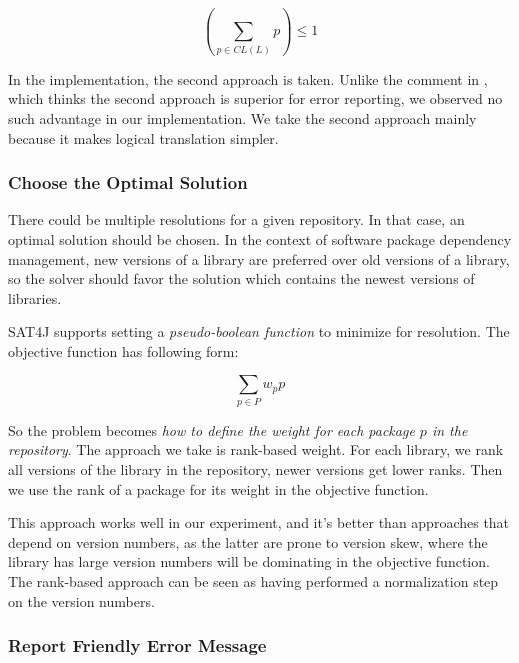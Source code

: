 \[
(\sum_{p \in CL(L)} p) \leq 1
\]




In the implementation, the second approach is taken. Unlike the comment in \cite{berre2009dependency}, which thinks the second approach is superior for error reporting, we observed no such advantage in our implementation. We take the second approach mainly because it makes logical translation simpler.

\subsubsection{Choose the Optimal Solution}

There could be multiple resolutions for a given repository. In that case, an optimal solution should be chosen. In the context of software package dependency management, new versions of a library are preferred over old versions of a library, so the solver should favor the solution which contains the newest versions of libraries.

SAT4J supports setting a \emph{pseudo-boolean function} to minimize for resolution. The objective function has following form:

\[
\sum_{p \in P} w_p p
\]

So the problem becomes \emph{how to define the weight for each package $p$ in the repository}. The approach we take is rank-based weight. For each library, we rank all versions of the library in the repository, newer versions get lower ranks. Then we use the rank of a package for its weight in the objective function.

This approach works well in our experiment, and it's better than approaches that depend on version numbers, as the latter are prone to version skew, where the library has large version numbers will be dominating in the objective function. The rank-based approach can be seen as having performed a normalization step on the version numbers.

\subsubsection{Report Friendly Error Message}

